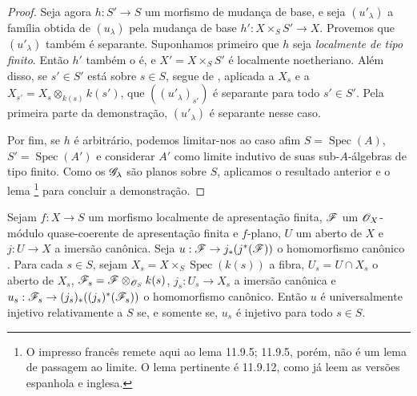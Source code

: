 \begin{proof}
Seja agora
$h:S'\to S$ um
morfismo de mudança
de base, e seja
$(u'_\lambda)$
a família obtida
de $(u_\lambda)$
pela mudança de base
$h':X\times_S S'\to X$.
Provemos que
$(u'_\lambda)$
também é separante.
Suponhamos primeiro
que $h$ seja
\emph{localmente de
tipo finito}. Então
$h'$ também o é,
e
$X'=X\times_S S'$
é localmente
noetheriano. Além
disso, se $s'\in S'$
está sobre $s\in S$,
segue de
,
aplicada a $X_s$ e
a
$X_{s'}=
X_s\otimes_{k(s)}k(s')$,
que
$((u'_\lambda)_{s'})$
é separante para
todo $s'\in S'$.
Pela primeira parte
da demonstração,
$(u'_\lambda)$
é separante nesse
caso.

Por fim, se $h$ é
arbitrário, podemos
limitar-nos ao caso
afim
$S=\operatorname{Spec}(A)$,
$S'=\operatorname{Spec}(A')$
e considerar $A'$
como limite indutivo
de suas sub-$A$-álgebras
de tipo finito.
Como os
$\mathscr{G}_\lambda$
são planos sobre
$S$, aplicamos
o resultado anterior
e o lema
\footnote{O impresso
francês remete aqui
ao lema 11.9.5;
11.9.5, porém, não
é um lema de passagem
ao limite. O lema
pertinente é 11.9.12,
como já leem as
versões espanhola
e inglesa.}
para concluir a
demonstração.
\end{proof}

\begin{proposition}[11.9.17]
\label{IV.11.9.17}
Sejam $f:X\to S$
um morfismo localmente
de apresentação finita,
$\mathscr{F}$ um
$\mathscr{O}_X$-módulo
quase-coerente de
apresentação finita
e $f$-plano,
$U$ um aberto de
$X$ e $j:U\to X$
a imersão canônica.
Seja
$u:\sh{F}\to
j_*(j^*(\sh{F}))$
o homomorfismo
canônico
.
Para cada $s\in S$,
sejam
$X_s=X\times_S
\operatorname{Spec}(k(s))$
a fibra,
$U_s=U\cap X_s$
o aberto de $X_s$,
$\mathscr{F}_s=
\mathscr{F}\otimes_{\mathscr{O}_S}
k(s)$,
$j_s:U_s\to X_s$
a imersão canônica
e
$u_s:\sh{F}_s\to
(j_s)_*((j_s)^*
(\sh{F}_s))$
o homomorfismo
canônico. Então
$u$ é universalmente
injetivo relativamente
a $S$ se, e somente
se, $u_s$ é injetivo
para todo $s\in S$.
\end{proposition}


